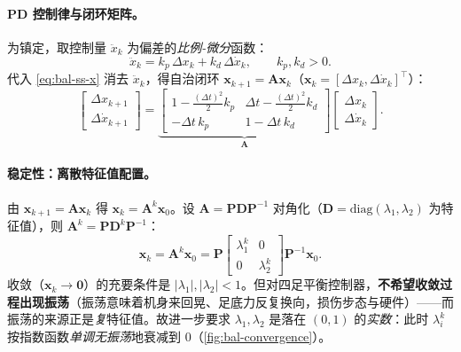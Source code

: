 \paragraph{PD 控制律与闭环矩阵。}
为镇定，取控制量 $\ddot x_k$ 为偏差的\emph{比例-微分}函数\cite{unitree2023quadruped}：
\begin{equation}
  \ddot x_k=k_p\,\Delta x_k+k_d\,\Delta\dot x_k,\qquad k_p,k_d>0.
  \label{eq:bal-pd}
\end{equation}
代入 \cref{eq:bal-ss-x} 消去 $\ddot x_k$，得自治闭环 $\boldsymbol{x}_{k+1}=\mathbf{A}\boldsymbol{x}_k$（$\boldsymbol{x}_k=[\Delta x_k,\Delta\dot x_k]^\top$）\cite{unitree2023quadruped}：
\begin{equation}
  \begin{bmatrix}\Delta x_{k+1}\\ \Delta\dot x_{k+1}\end{bmatrix}
  =\underbrace{\begin{bmatrix}1-\tfrac{(\Delta t)^2}{2}k_p & \Delta t-\tfrac{(\Delta t)^2}{2}k_d\\[3pt] -\Delta t\,k_p & 1-\Delta t\,k_d\end{bmatrix}}_{\mathbf{A}}
  \begin{bmatrix}\Delta x_k\\ \Delta\dot x_k\end{bmatrix}.
  \label{eq:bal-closed}
\end{equation}

\paragraph{稳定性：离散特征值配置。}
由 $\boldsymbol{x}_{k+1}=\mathbf{A}\boldsymbol{x}_k$ 得 $\boldsymbol{x}_k=\mathbf{A}^k\boldsymbol{x}_0$。设 $\mathbf{A}=\mathbf{P}\mathbf{D}\mathbf{P}^{-1}$ 对角化（$\mathbf{D}=\mathrm{diag}(\lambda_1,\lambda_2)$ 为特征值），则 $\mathbf{A}^k=\mathbf{P}\mathbf{D}^k\mathbf{P}^{-1}$\cite{unitree2023quadruped}：
\begin{equation}
  \boldsymbol{x}_k=\mathbf{A}^k\boldsymbol{x}_0
  =\mathbf{P}\begin{bmatrix}\lambda_1^k & 0\\ 0 & \lambda_2^k\end{bmatrix}\mathbf{P}^{-1}\boldsymbol{x}_0.
  \label{eq:bal-diag}
\end{equation}
收敛（$\boldsymbol{x}_k\to\boldsymbol{0}$）的充要条件是 $|\lambda_1|,|\lambda_2|<1$。但对四足平衡控制器，\textbf{不希望收敛过程出现振荡}（振荡意味着机身来回晃、足底力反复换向，损伤步态与硬件）——而振荡的来源正是\emph{复}特征值。故进一步要求 $\lambda_1,\lambda_2$ 是落在 $(0,1)$ 的\emph{实数}：此时 $\lambda_i^k$ 按指数函数\emph{单调无振荡}地衰减到 $0$（\cref{fig:bal-convergence}）\cite{unitree2023quadruped}。

